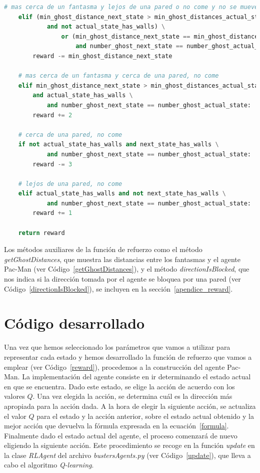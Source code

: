\documentclass[11pt]{exam}
\begin{document}
\begin{lstlisting}[caption={Función de refuerzo.}, label={reward}, language=python, basicstyle=\scriptsize]
	 # mas cerca de un fantasma y lejos de una pared o no come y no se mueve
	elif (min_ghost_distance_next_state > min_ghost_distances_actual_state 
			and not actual_state_has_walls) \
				or (min_ghost_distance_next_state == min_ghost_distances_actual_state
					and number_ghost_next_state == number_ghost_actual_state):
		reward -= min_ghost_distance_next_state
	
	# mas cerca de un fantasma y cerca de una pared, no come
	elif min_ghost_distance_next_state > min_ghost_distances_actual_state \
		and actual_state_has_walls \
			and number_ghost_next_state == number_ghost_actual_state:
		reward += 2
	
	# cerca de una pared, no come
	if not actual_state_has_walls and next_state_has_walls \
			and number_ghost_next_state == number_ghost_actual_state:
		reward -= 3
		
	# lejos de una pared, no come
	elif actual_state_has_walls and not next_state_has_walls \
			and number_ghost_next_state == number_ghost_actual_state:
		reward += 1
	
	return reward
\end{lstlisting}

Los métodos auxiliares de la función de refuerzo como el método \textit{getGhostDistances}, que muestra las distancias entre los fantasmas y el agente Pac-Man (ver Código~\ref{getGhostDistances}), y el método \textit{directionIsBlocked}, que nos indica si la dirección tomada por el agente se bloquea por una pared (ver Código~\ref{directionIsBlocked}), se incluyen en la sección~\ref*{apendice_reward}.

\section{Código desarrollado}\label{codigo}

Una vez que hemos seleccionado los parámetros que vamos a utilizar para representar cada estado y hemos desarrollado la función de refuerzo que vamos a emplear (ver Código~\ref{reward}), procedemos a la construcción del agente Pac-Man. La implementación del agente consiste en ir determinando el estado actual en que se encuentra. Dado este estado, se elige la acción de acuerdo con los valores $Q$. Una vez elegida la acción, se determina cuál es la dirección más apropiada para la acción dada. A la hora de elegir la siguiente acción, se actualiza el valor $Q$ para el estado y la acción anterior, sobre el estado actual obtenido y la mejor acción que devuelva la fórmula expresada en la ecuación~\ref{formula}. Finalmente dado el estado actual del agente, el proceso comenzará de nuevo eligiendo la siguiente acción. Este procedimiento se recoge en la función \textit{update} en la clase \textit{RLAgent} del archivo \textit{bustersAgents.py} (ver Código~\ref{update}), que lleva a cabo el algoritmo \textit{Q-learning}. 
\vspace*{2mm}
\end{document}

